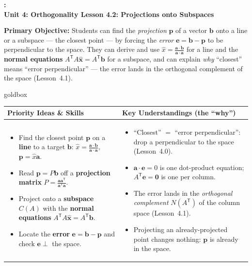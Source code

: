 \documentclass[10pt]{article}
\newcommand{\xx}{\mathbf{x}}
\newcommand{\bb}{\mathbf{b}}
\newcommand{\pp}{\mathbf{p}}
\newcommand{\ee}{\mathbf{e}}
\newcommand{\avec}{\mathbf{a}}
\newcommand{\zero}{\mathbf{0}}
\newcommand{\T}{\mathsf{T}}
\newcommand{\UnitNumberName}{Unit 4: Orthogonality \quad}
\newcommand{\LessonNumberName}{Lesson 4.2: Projections onto Subspaces}
\begin{document}
\begin{center}
    {\Large\bfseries \CourseName: \SchoolYear \\
    {\small\bfseries \UnitNumberName \LessonNumberName}}
\end{center}

\begin{tcolorbox}[colback=blush, colframe=burgundy, boxrule=0.9pt, arc=2mm,
    left=2mm, right=2mm, top=1.5mm, bottom=1.5mm]
    \textbf{Primary Objective:} Students can find the \emph{projection} $\pp$ of a vector $\bb$ onto a
    line or a subspace --- the closest point --- by forcing the \emph{error} $\ee=\bb-\pp$ to be
    perpendicular to the space. They can derive and use $\hat{x}=\frac{\avec\cdot\bb}{\avec\cdot\avec}$
    for a line and the \textbf{normal equations} $A^{\T}A\hat{\xx}=A^{\T}\bb$ for a subspace, and can
    explain \emph{why} ``closest'' means ``error perpendicular'' --- the error lands in the orthogonal
    complement of the space (Lesson~4.1).
\end{tcolorbox}

\renewcommand{\arraystretch}{1.4}
\begin{skillbox}{goldbox}
\begin{tabularx}{\linewidth}{@{}X|X@{}}
\textbf{Priority Ideas \& Skills} & \textbf{Key Understandings (the ``why'')} \\[2pt]
\hline
\vspace{-6pt}
\begin{itemize}[leftmargin=1.1em, nosep, after=\vspace{2pt}]
  \item Find the closest point $\pp$ on a \textbf{line} to a target $\bb$: $\hat{x}=\frac{\avec\cdot\bb}{\avec\cdot\avec}$, $\pp=\hat{x}\avec$.
  \item Read $\pp=P\bb$ off a \textbf{projection matrix} $P=\frac{\avec\avec^{\T}}{\avec^{\T}\avec}$.
  \item Project onto a \textbf{subspace} $C(A)$ with the \textbf{normal equations} $A^{\T}A\hat{\xx}=A^{\T}\bb$.
  \item Locate the \textbf{error} $\ee=\bb-\pp$ and check $\ee\perp$ the space.
\end{itemize}
&
\vspace{-6pt}
\begin{itemize}[leftmargin=1.1em, nosep, after=\vspace{2pt}]
  \item ``Closest'' $=$ ``error perpendicular'': drop a perpendicular to the space (Lesson~4.0).
  \item $\avec\cdot\ee=0$ is one dot-product equation; $A^{\T}\ee=\zero$ is one per column.
  \item The error lands in the \emph{orthogonal complement} $N(A^{\T})$ of the column space (Lesson~4.1).
  \item Projecting an already-projected point changes nothing: $\pp$ is already in the space.
\end{itemize}
\end{tabularx}
\end{skillbox}
\end{document}
